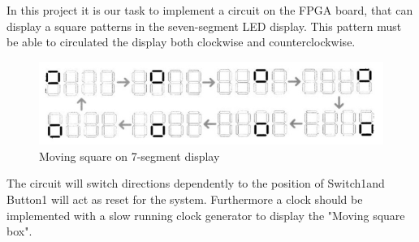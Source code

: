 In this project it is our task to implement a circuit on the FPGA board, that can display a square patterns in the seven-segment LED display. This pattern must be able to  circulated the display both clockwise and counterclockwise.

\begin{figure}[!htbp] 
	\centering 
		\includegraphics[scale=0.4]{fig/DigitBox.jpg} 
	\caption{Moving square on 7-segment display}
	\label{fig:1} 
\end{figure}

The circuit will switch directions dependently to the position of Switch1and Button1 will act as reset for the system. Furthermore a clock should be implemented with a slow running clock generator to display the "Moving square box".